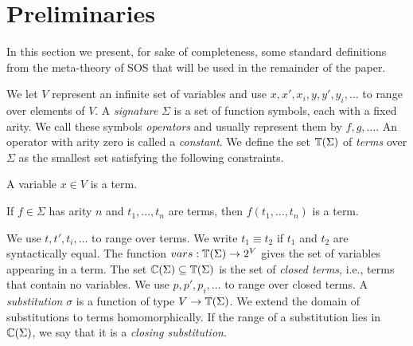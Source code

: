 \section{\label{sec::pre}Preliminaries}

In this section we present, for sake of completeness, some standard definitions from
the meta-theory of SOS that will be used in the remainder of the paper.

\begin{definition}
    We let $V$ represent an infinite set of variables and use $x,x',x_i,y,y',y_i,\dots$ to range over elements of $V$.
    A \emph{signature} $\Sigma$ is a set of function symbols, each with a fixed arity. We call these symbols
    \emph{operators} and usually represent them by $f,g,\dots$. An operator with arity zero is called a
    \emph{constant}. We define the set $\mathbb{T}(\Sigma)$ of \emph{terms} over $\Sigma$ as the smallest set satisfying the following constraints.
    \begin{bullets}
        \item A variable $x\in V$ is a term.
        \item If $f\in \Sigma$ has arity $n$ and $t_1,\dots,t_n$ are terms, then $f(t_1,\dots,t_n)$ is a term.
    \end{bullets}
    We use $t,t',t_i,\dots$ to range over terms. We write $t_1 \equiv t_2$ if $t_1$ and $t_2$ are syntactically equal.
    The function $vars : \mathbb{T}(\Sigma) \rightarrow 2^V$ gives the set of variables appearing in a term.
    The set $\mathbb{C}(\Sigma) \subseteq \mathbb{T}(\Sigma)$ is the set of \emph{closed terms}, i.e., terms that contain no variables.
    We use $p,p',p_i,\dots$ to range over closed terms.
    A \emph{substitution} $\sigma$ is a function of type $V \rightarrow \mathbb{T}(\Sigma)$. We extend the domain of substitutions to terms
    homomorphically. If the range of a substitution lies in $\mathbb{C}(\Sigma)$, we say that it is a \emph{closing substitution}.
\end{definition}

